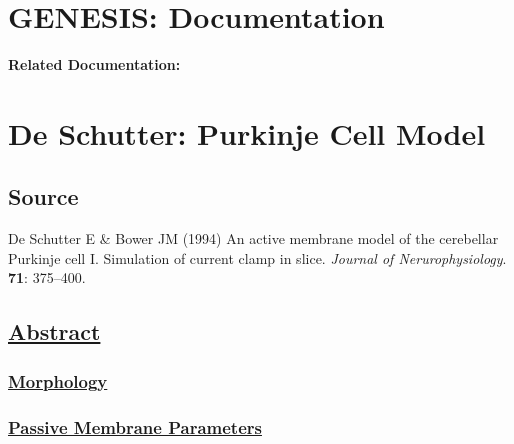 \documentclass[12pt]{article}
\begin{document}
\section*{GENESIS: Documentation}

{\bf Related Documentation:}

\section*{De Schutter: Purkinje Cell Model}

\subsection*{Source}

De Schutter E \& Bower JM (1994) An active membrane model of the cerebellar Purkinje cell I. Simulation of current clamp in slice. {\it Journal of Nerurophysiology}. {\bf 71}: 375--400.

\subsection*{\href{../pub-purkinje-deschutter-abstract/pub-purkinje-deschutter-abstract.tex}{\bf Abstract}}



\subsubsection*{\href{../pub-purkinje-deschutter-morphology/pub-purkinje-deschutter-morphology.tex}{\bf Morphology}}

\subsubsection*{\href{../pub-purkinje-deschutter-passive/pub-purkinje-deschutter-passive.tex}{\bf Passive Membrane Parameters}}
\end{document}
